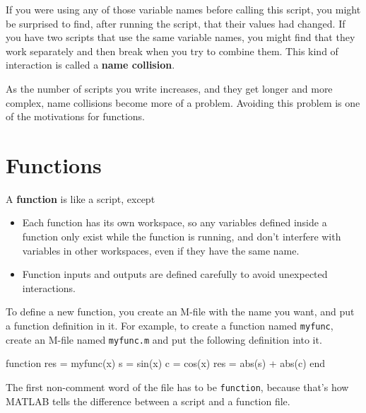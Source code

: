 \documentclass[
]{book}
\numberwithin{Answer}{chapter}
\numberwithin{Exercise}{chapter}
\begin{document}
If you were using any of those variable names before calling this
script, you might be surprised to find, after running the script,
that their values had changed.  If you have two scripts that use
the same variable names, you might find that they work separately
and then break when you try to combine them.  This kind of
interaction is called a {\bf name collision}.


As the number of scripts you write increases, and they get longer
and more complex, name collisions become more of a problem.  Avoiding
this problem is one of the motivations for functions.


\section{Functions}
\label{sect:functions}


A {\bf function} is like a script, except

\begin{itemize}

\item Each function has its own workspace, so any variables defined
inside a function only exist while the function is running, and don't
interfere with variables in other workspaces, even if they have the
same name.

\item Function inputs and outputs are defined carefully to avoid
unexpected interactions.

\end{itemize}

To define a new function, you create an M-file with the name you
want, and put a function definition in it.  For example, to create
a function named {\tt myfunc}, create an M-file named {\tt myfunc.m}
and put the following definition into it.


\begin{code}
function res = myfunc(x)
    s = sin(x)
    c = cos(x)
    res = abs(s) + abs(c)
end
\end{code}

The first non-comment word of the file has to be {\tt function}, because
that's how MATLAB tells the difference between a script and a function
file.

\end{document}
